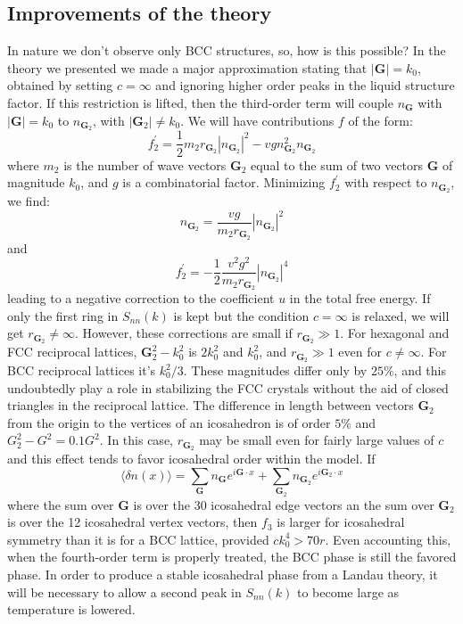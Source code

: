 \documentclass[12pt,a4paper]{article}
\begin{document}
\subsection{Improvements of the theory}
In nature we don't observe only BCC structures, so, how is this possible? In the theory we presented we made a major approximation stating that $|\textbf{G}|=k_0$, obtained by setting $c=\infty$ and ignoring higher order peaks in the liquid structure factor. If this restriction is lifted, then the third-order term will couple $n_{\textbf{G}}$ with $|\textbf{G}|=k_0$ to $n_{\textbf{G}_2}$, with $|\textbf{G}_2|\neq k_0$. We will have contributions $f$ of the form:
\begin{equation}
f^\prime_2=\frac{1}{2}m_2 r_{\textbf{G}_2}|n_{\textbf{G}_2}|^2-vgn_{\textbf{G}_2}^2n_{\textbf{G}_2}
\end{equation}
where $m_2$ is the number of wave vectors $\textbf{G}_2$ equal to the sum of two vectors $\textbf{G}$ of magnitude $k_0$, and $g$ is a combinatorial factor. Minimizing $f^\prime_2$ with respect to  $n_{\textbf{G}_2}$, we find:
\begin{equation}
n_{\textbf{G}_2}=\frac{vg}{m_2 r_{\textbf{G}_2}}|n_{\textbf{G}_2}|^2
\end{equation}
and
\begin{equation}
f^\prime_2=-\frac{1}{2}\frac{v^2g^2}{m_2r_{\textbf{G}_2}}|n_{\textbf{G}_2}|^4
\end{equation}
leading to a negative correction to the coefficient $u$ in the total free energy. If only the first ring in $S_{nn}(k)$ is kept but the condition $c=\infty$ is relaxed, we will get $r_{\textbf{G}_2}\neq\infty$. However, these corrections are small if $r_{\textbf{G}_2}\gg 1$. For hexagonal and FCC reciprocal lattices, $\textbf{G}^2_2-k^2_0$ is $2k_0^2$ and $k^2_0$, and $r_{\textbf{G}_2}\gg 1$ even for $ c \neq \infty$. For BCC reciprocal lattices it's $k_0^2/3$. These magnitudes differ only by $25\%$, and this undoubtedly play a role in stabilizing the FCC crystals without the aid of closed triangles in the reciprocal lattice. The difference in length between vectors $\textbf{G}_2$ from the origin to the vertices of an icosahedron is of order $5\%$ and $G_2^2-G^2=0.1G^2$. In this case, $r_{\textbf{G}_2}$ may be small even for fairly large values of $c$ and this effect tends to favor icosahedral order within the model. If
\begin{equation}
\langle\delta n(x)\rangle = \sum_{\textbf{G}}n_{\textbf{G}}e^{i\textbf{G}\cdot x}+\sum_{\textbf{G}_2}n_{\textbf{G}_2}e^{i\textbf{G}_2\cdot x}
\end{equation}
where the sum over $\textbf{G}$ is over the 30 icosahedral edge vectors an the sum over $\textbf{G}_2$ is over the 12 icosahedral vertex vectors, then $f_3$ is larger for icosahedral symmetry than it is for a BCC lattice, provided $ck_0^4>70r$. Even accounting this, when the fourth-order term is properly treated, the BCC phase is still the favored phase. In order to produce a stable icosahedral phase from a Landau theory, it will be necessary to allow a second peak in $S_{nn}(k)$ to become large as temperature is lowered.
\end{document}
